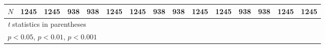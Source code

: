 {\begin{tabular}{l*{14}{c}}
\hline
\(N\)       &        1245         &        1245         &         938         &         938         &        1245         &        1245         &         938         &         938         &        1245         &        1245         &         938         &         938         &        1245         &        1245         \\
\hline\hline
\multicolumn{15}{l}{\footnotesize \textit{t} statistics in parentheses}\\
\multicolumn{15}{l}{\footnotesize \sym{*} \(p<0.05\), \sym{**} \(p<0.01\), \sym{***} \(p<0.001\)}\\
\end{tabular}
}
